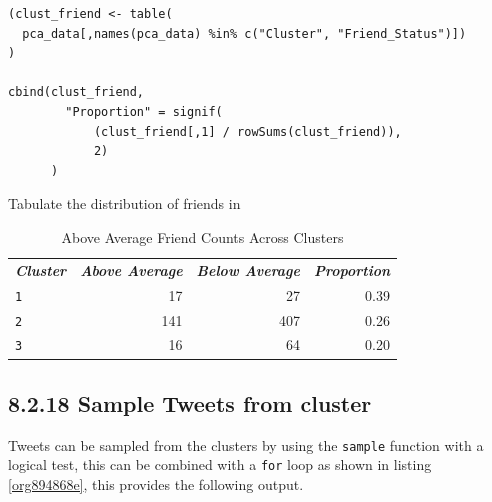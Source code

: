 \documentclass[11pt]{article}
\begin{document}
\begin{listing}[htbp]
\begin{verbatim}
(clust_friend <- table(
  pca_data[,names(pca_data) %in% c("Cluster", "Friend_Status")])
)

cbind(clust_friend,
        "Proportion" = signif(
            (clust_friend[,1] / rowSums(clust_friend)),
            2)
      )
\end{verbatim}
\caption{\label{orgef2302c}Tabulate the distribution of friends in}
\end{listing}

\begin{table}[htbp]
\caption{\label{tab:org849170c}Above Average Friend Counts Across Clusters}
\centering
\begin{tabular}{lrrr}
\textbf{\emph{Cluster}} & \textbf{\emph{Above Average}} & \textbf{\emph{Below Average}} & \textbf{\emph{Proportion}}\\
\texttt{1} & 17 & 27 & 0.39\\
\texttt{2} & 141 & 407 & 0.26\\
\texttt{3} & 16 & 64 & 0.20\\
\end{tabular}
\end{table}

\subsection{8.2.18 Sample Tweets from cluster}
\label{sec:org4aaee26}
Tweets can be sampled from the clusters by using the \texttt{sample} function with a logical test, this can be combined with a \texttt{for} loop as shown in listing \ref{org894868e}, this provides the following output.
\end{document}

